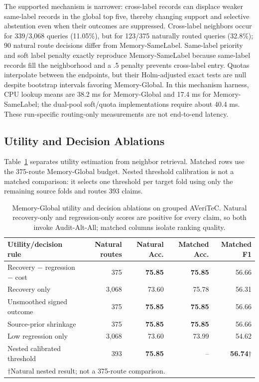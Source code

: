 \documentclass[runningheads]{llncs}
\begin{document}
The supported mechanism is narrower: cross-label records can displace weaker
same-label records in the global top five, thereby changing support and
selective abstention even when their outcomes are suppressed. Cross-label
neighbors occur for 339/3,068 queries (11.05\%), but for 123/375 naturally
routed queries (32.8\%); 90 natural route decisions differ from Memory-SameLabel.
Same-label priority and soft label penalty exactly reproduce Memory-SameLabel because same-label records fill the
neighborhood and a .5 penalty prevents cross-label entry. Quotas interpolate
between the endpoints, but their Holm-adjusted exact tests are null despite
bootstrap intervals favoring Memory-Global. In this mechanism harness, CPU lookup means
are 38.2 ms for Memory-Global and 17.4 ms for Memory-SameLabel; the dual-pool soft/quota
implementations require about 40.4 ms. These run-specific routing-only
measurements are not end-to-end latency.

\subsection{Utility and Decision Ablations}
\label{sec:utility-ablation}

Table~\ref{tab:utility-ablation} separates utility estimation from neighbor
retrieval. Matched rows use the 375-route Memory-Global budget. Nested
threshold calibration is not a matched
comparison: it selects one threshold per target fold using only the remaining
source folds and routes 393 claims.

\begin{table}[t]
\caption{Memory-Global utility and decision ablations on grouped AVeriTeC.
Natural recovery-only and regression-only scores are positive for every
claim, so both invoke Audit-Alt-All; matched columns isolate ranking quality.}
\label{tab:utility-ablation}
\centering\small
\begin{tabular}{lrrrr}
\toprule
Utility/decision rule & Natural routes & Natural Acc. & Matched Acc. & Matched F1 \\
\midrule
Recovery $-$ regression $-$ cost & 375 & \textbf{75.85} & \textbf{75.85} & 56.66 \\
Recovery only & 3,068 & 73.60 & 75.78 & 56.31 \\
Unsmoothed signed outcome & 375 & \textbf{75.85} & \textbf{75.85} & 56.66 \\
Source-prior shrinkage & 375 & \textbf{75.85} & \textbf{75.85} & 56.66 \\
Low regression only & 3,068 & 73.60 & 73.99 & 54.62 \\
Nested calibrated threshold & 393 & \textbf{75.85} & -- & \textbf{56.74}$\dagger$ \\
\bottomrule
\multicolumn{5}{l}{\footnotesize $\dagger$Natural nested result; not a 375-route comparison.} \\
\end{tabular}
\end{table}
\end{document}

